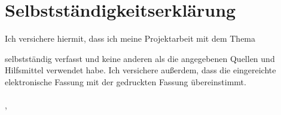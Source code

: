 
\newpage
\section*{Selbstständigkeitserklärung}
Ich versichere hiermit, dass ich meine Projektarbeit mit dem Thema
\begin{center}
\textbf{\mytitle}
\end{center}
selbstständig verfasst und keine anderen als die angegebenen Quellen und Hilfsmittel verwendet habe. Ich versichere außerdem, dass die eingereichte elektronische Fassung mit der gedruckten Fassung übereinstimmt.\\
\\
\vspace{15mm}
\noindent{}\mysubmissionplace , \mydate
\hfill
\begin{minipage}[t]{6cm}
\centering \dotfill \\
\myauthor
\end{minipage}